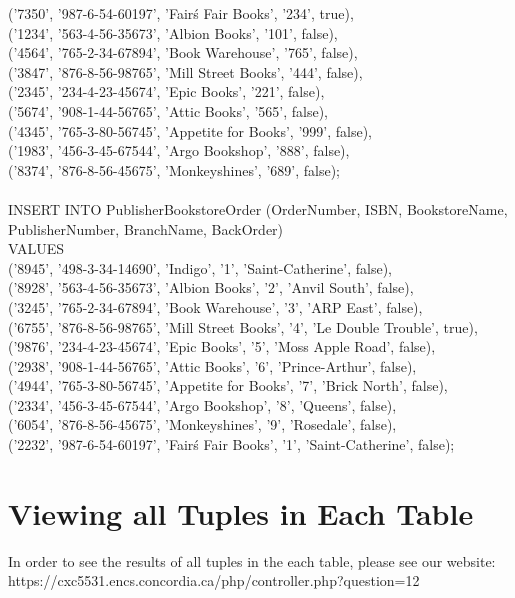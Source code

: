 \documentclass{scrreprt}
\begin{document}
       ('7350', '987-6-54-60197', 'Fair\'s Fair Books', '234', true),\\
       ('1234', '563-4-56-35673', 'Albion Books', '101', false),\\
       ('4564', '765-2-34-67894', 'Book Warehouse', '765', false),\\
       ('3847', '876-8-56-98765', 'Mill Street Books', '444', false),\\
       ('2345', '234-4-23-45674', 'Epic Books', '221', false),\\
       ('5674', '908-1-44-56765', 'Attic Books', '565', false),\\
       ('4345', '765-3-80-56745', 'Appetite for Books', '999', false),\\
       ('1983', '456-3-45-67544', 'Argo Bookshop', '888', false),\\
       ('8374', '876-8-56-45675', 'Monkeyshines', '689', false);\\\\
INSERT INTO PublisherBookstoreOrder (OrderNumber, ISBN, BookstoreName, PublisherNumber, BranchName, BackOrder)\\
VALUES\\ ('8945', '498-3-34-14690', 'Indigo', '1', 'Saint-Catherine', false),\\
       ('8928', '563-4-56-35673', 'Albion Books', '2', 'Anvil South', false),\\
       ('3245', '765-2-34-67894', 'Book Warehouse', '3', 'ARP East', false),\\
       ('6755', '876-8-56-98765', 'Mill Street Books', '4', 'Le Double Trouble', true),\\
       ('9876', '234-4-23-45674', 'Epic Books', '5', 'Moss Apple Road', false),\\
       ('2938', '908-1-44-56765', 'Attic Books', '6', 'Prince-Arthur', false),\\
       ('4944', '765-3-80-56745', 'Appetite for Books', '7', 'Brick North', false),\\
       ('2334', '456-3-45-67544', 'Argo Bookshop', '8', 'Queens', false),\\
       ('6054', '876-8-56-45675', 'Monkeyshines', '9', 'Rosedale', false),\\
       ('2232', '987-6-54-60197', 'Fair\'s Fair Books', '1', 'Saint-Catherine', false);\\

\chapter{Viewing all Tuples in Each Table}

In order to see the results of all tuples in the each table, please see our website: https://cxc5531.encs.concordia.ca/php/controller.php?question=12
\end{document}
